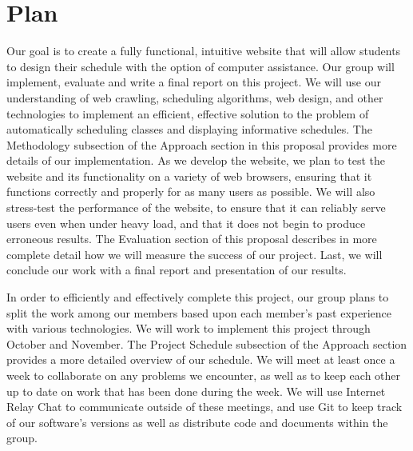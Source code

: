 \section{Plan}
Our goal is to create a fully functional, intuitive website that will allow students to design their 
schedule with the option of computer assistance. Our group will implement, evaluate and write a final
report on this project. We will use our understanding of web crawling, scheduling algorithms, web design,
and other technologies to implement an efficient, effective solution to the problem of automatically
scheduling classes and displaying informative schedules. The Methodology subsection 
of the Approach section in this proposal provides more details of our implementation.
As we develop the website, we plan to test the website and its functionality on a variety
of web browsers, ensuring that it functions correctly and properly for as many users as possible.
We will also stress-test the performance of the website, to ensure that it can reliably serve
users even when under heavy load, and that it does not begin to produce erroneous results.
The Evaluation section of this proposal describes in more complete detail how we will measure
the success of our project. Last, we will conclude our work with a final report and presentation of our results.

In order to efficiently and effectively complete this project, our group plans to split the work among
our members based upon each member's past experience with various technologies. We will work
to implement this project through October and November. The Project Schedule subsection 
of the Approach section provides a more detailed overview of our schedule.
We will meet at least once a week to collaborate on any problems we encounter, as well
as to keep each other up to date on work that has been done during the week. We will
use Internet Relay Chat to communicate outside of these meetings, and use Git to
keep track of our software's versions as well as distribute code and documents within
the group.